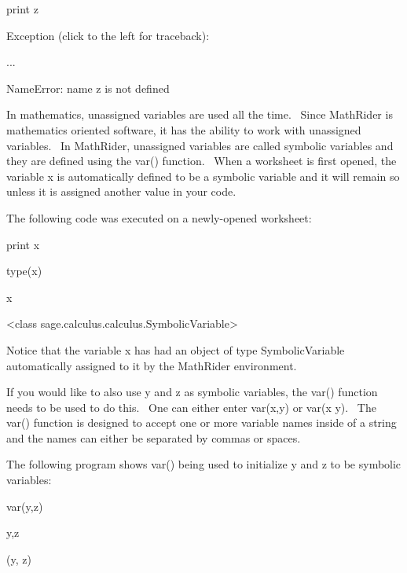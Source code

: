 \documentclass[12pt,twoside]{book}
\begin{document}
\bigskip

print z

{\textbar}

Exception (click to the left for traceback):

...

NameError: name {\textquotesingle}z{\textquotesingle} is not defined


\bigskip

In mathematics, {\textquotedbl}unassigned variables{\textquotedbl} are used all the time. \ Since MathRider is mathematics oriented software, it has the ability to work with unassigned variables. \ In MathRider, unassigned variables are called symbolic variables and they are defined using the var() function. \ When a worksheet is first opened, the variable x is automatically defined to be a symbolic variable and it will remain so unless it is assigned another value in your code. 

\bigskip

The following code was executed on a newly{}-opened worksheet:


\bigskip

print x

type(x)

{\textbar}

x

{\textless}class {\textquotesingle}sage.calculus.calculus.SymbolicVariable{\textquotesingle}{\textgreater}

Notice that the variable x has had an object of type SymbolicVariable automatically assigned to it by the MathRider environment. 

\bigskip

If you would like to also use y and z as symbolic variables, the var() function needs to be used to do this. \ One can either enter var({\textquotesingle}x,y{\textquotesingle}) or var({\textquotesingle}x y{\textquotesingle}). \ The var() function is designed to accept one or more variable names inside of a string and the names can either be separated by commas or spaces. 

\bigskip

The following program shows var() being used to initialize y and z to be symbolic variables: 

\bigskip

var({\textquotesingle}y,z{\textquotesingle})

y,z

{\textbar}

(y, z)
\end{document}
